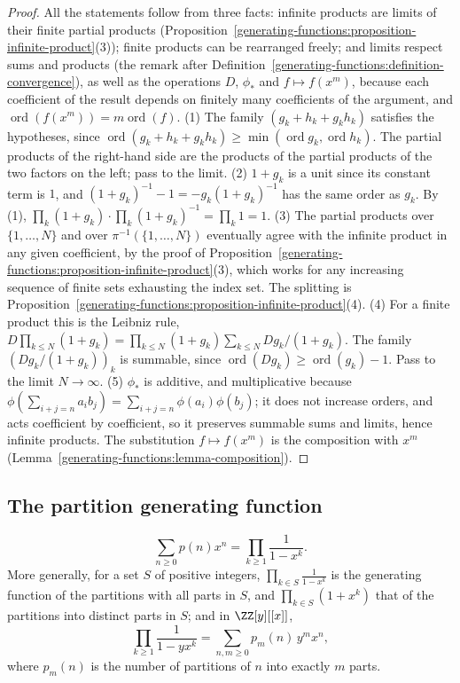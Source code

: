 \begin{proof}
All the statements follow from three facts: infinite products are limits of their finite partial products (Proposition~\ref{generating-functions:proposition-infinite-product}(3)); finite products
can be rearranged freely; and limits respect sums and products (the remark after Definition~\ref{generating-functions:definition-convergence}), as well as the operations $D$, $\phi_\ast$ and
$f \mapsto f(x^m)$, because each coefficient of the result depends on finitely many coefficients of the argument, and $\operatorname{ord}(f(x^m)) = m\operatorname{ord}(f)$.
(1) The family $(g_k + h_k + g_kh_k)$ satisfies the hypotheses, since $\operatorname{ord}(g_k + h_k + g_kh_k) \geq \min(\operatorname{ord} g_k, \operatorname{ord} h_k)$. The partial products of
the right-hand side are the products of the partial products of the two factors on the left; pass to the limit.
(2) $1 + g_k$ is a unit since its constant term is $1$, and $(1 + g_k)^{-1} - 1 = -g_k(1 + g_k)^{-1}$ has the same order as $g_k$. By (1), $\prod_k(1 + g_k) \cdot \prod_k(1 + g_k)^{-1} = \prod_k1 = 1$.
(3) The partial products over $\{1, \ldots, N\}$ and over $\pi^{-1}(\{1, \ldots, N\})$ eventually agree with the infinite product in any given coefficient, by the proof of
Proposition~\ref{generating-functions:proposition-infinite-product}(3), which works for any increasing sequence of finite sets exhausting the index set. The splitting is
Proposition~\ref{generating-functions:proposition-infinite-product}(4).
(4) For a finite product this is the Leibniz rule, $D\prod_{k \leq N}(1 + g_k) = \prod_{k \leq N}(1 + g_k)\sum_{k \leq N}Dg_k/(1 + g_k)$. The family $(Dg_k/(1 + g_k))_k$ is summable, since
$\operatorname{ord}(Dg_k) \geq \operatorname{ord}(g_k) - 1$. Pass to the limit $N \to \infty$.
(5) $\phi_\ast$ is additive, and multiplicative because $\phi(\sum_{i+j=n}a_ib_j) = \sum_{i+j=n}\phi(a_i)\phi(b_j)$; it does not increase orders, and acts coefficient by coefficient, so it preserves
summable sums and limits, hence infinite products. The substitution $f \mapsto f(x^m)$ is the composition with $x^m$ (Lemma~\ref{generating-functions:lemma-composition}).
\end{proof}

\subsection{The partition generating function}\label{generating-functions:subsection-partition-gf}

\begin{theorem}[Euler]\label{generating-functions:theorem-partition-gf}
\[
\sum_{n \geq 0}p(n)x^n = \prod_{k \geq 1}\frac{1}{1 - x^k}.
\]
More generally, for a set $S$ of positive integers, $\prod_{k \in S}\frac{1}{1 - x^k}$ is the generating function of the partitions with all parts in $S$, and $\prod_{k \in S}(1 + x^k)$ that of the
partitions into distinct parts in $S$; and in $\ZZ[y][[x]]$,
\[
\prod_{k \geq 1}\frac{1}{1 - yx^k} = \sum_{n, m \geq 0}p_m(n)\,y^mx^n,
\]
where $p_m(n)$ is the number of partitions of $n$ into exactly $m$ parts.
\end{theorem}

